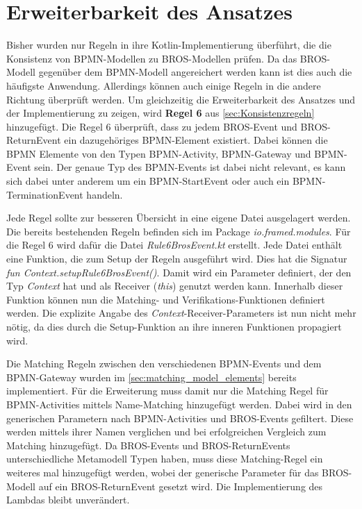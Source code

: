\section{Erweiterbarkeit des Ansatzes}

Bisher wurden nur Regeln in ihre Kotlin-Implementierung überführt, die die Konsistenz von BPMN-Modellen zu BROS-Modellen prüfen.
Da das BROS-Modell gegenüber dem BPMN-Modell angereichert werden kann ist dies auch die häufigste Anwendung.
Allerdings können auch einige Regeln in die andere Richtung überprüft werden.
Um gleichzeitig die Erweiterbarkeit des Ansatzes und der Implementierung zu zeigen, wird \textbf{Regel 6} aus \cref{sec:Konsistenzregeln} hinzugefügt.
Die Regel 6 überprüft, dass zu jedem BROS-Event und BROS-ReturnEvent ein dazugehöriges BPMN-Element existiert. 
Dabei können die BPMN Elemente von den Typen BPMN-Activity, BPMN-Gateway und BPMN-Event sein. 
Der genaue Typ des BPMN-Events ist dabei nicht relevant, es kann sich dabei unter anderem um ein BPMN-StartEvent oder auch ein BPMN-TerminationEvent handeln.

Jede Regel sollte zur besseren Übersicht in eine eigene Datei ausgelagert werden.
Die bereits bestehenden Regeln befinden sich im Package \emph{io.framed.modules}.
Für die Regel 6 wird dafür die Datei \emph{Rule6BrosEvent.kt} erstellt.
Jede Datei enthält eine Funktion, die zum Setup der Regeln ausgeführt wird.
Dies hat die Signatur \emph{fun Context.setupRule6BrosEvent()}.
Damit wird ein Parameter definiert, der den Typ \emph{Context} hat und als Receiver (\emph{this}) genutzt werden kann.
Innerhalb dieser Funktion können nun die Matching- und Verifikations-Funktionen definiert werden.
Die explizite Angabe des \emph{Context}-Receiver-Parameters ist nun nicht mehr nötig, da dies durch die Setup-Funktion an ihre inneren Funktionen propagiert wird. 

Die Matching Regeln zwischen den verschiedenen BPMN-Events und dem BPMN-Gateway wurden im \cref{sec:matching_model_elements} bereits implementiert.
Für die Erweiterung muss damit nur die Matching Regel für BPMN-Activities mittels Name-Matching hinzugefügt werden.
Dabei wird in den generischen Parametern nach BPMN-Activities und BROS-Events gefiltert.
Diese werden mittels ihrer Namen verglichen und bei erfolgreichen Vergleich zum Matching hinzugefügt.
Da BROS-Events und BROS-ReturnEvents unterschiedliche Metamodell Typen haben, muss diese Matching-Regel ein weiteres mal hinzugefügt werden, wobei der generische Parameter für das BROS-Modell auf ein BROS-ReturnEvent gesetzt wird.
Die Implementierung des Lambdas bleibt unverändert.

